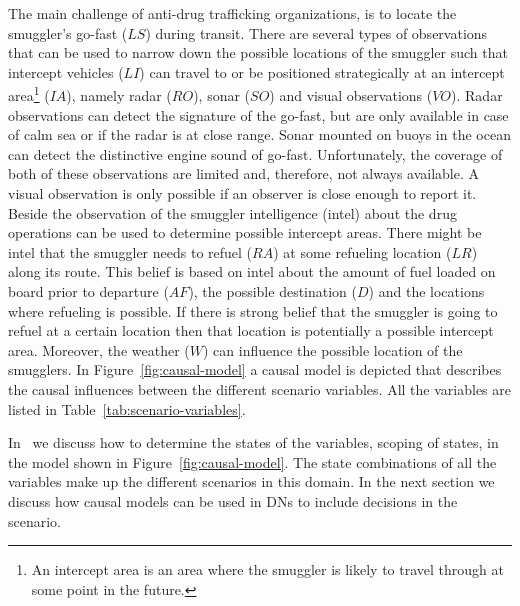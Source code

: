 \documentclass[conference]{IEEEtran}
\begin{document}
The main challenge of anti-drug trafficking organizations, is to locate the smuggler's go-fast ($LS$) during transit. There are several types of observations that can be used to narrow down the possible locations of the smuggler such that intercept vehicles ($LI$) can travel to or be positioned strategically at an intercept area\footnote{An intercept area is an area where the smuggler is likely to travel through at some point in the future.} ($IA$), namely radar ($RO$), sonar ($SO$) and visual observations ($VO$). Radar observations can detect the signature of the go-fast, but are only available in case of calm sea or if the radar is at close range. Sonar mounted on buoys in the ocean can detect the distinctive engine sound of go-fast. Unfortunately, the coverage of both of these observations are limited and, therefore, not always available. A visual observation is only possible if an observer is close enough to report it. Beside the observation of the smuggler intelligence (intel) about the drug operations can be used to determine possible intercept areas. There might be intel that the smuggler needs to refuel ($RA$) at some refueling location ($LR$) along its route. This belief is based on intel about the amount of fuel loaded on board prior to departure ($AF$), the possible destination ($D$) and the locations where refueling is possible. If there is strong belief that the smuggler is going to refuel at a certain location then that location is potentially a possible intercept area. Moreover, the weather ($W$) can influence the possible location of the smugglers. In Figure~\ref{fig:causal-model} a causal model is depicted that describes the causal influences between the different scenario variables. All the variables are listed in Table~\ref{tab:scenario-variables}.

In~\cite{conrado14if} we discuss how to determine the states of the variables, \ie scoping of states, in the model shown in Figure~\ref{fig:causal-model}. The state combinations of all the variables make up the different scenarios in this domain. In the next section we discuss how causal models can be used in DNs to include decisions in the scenario.
\end{document}
